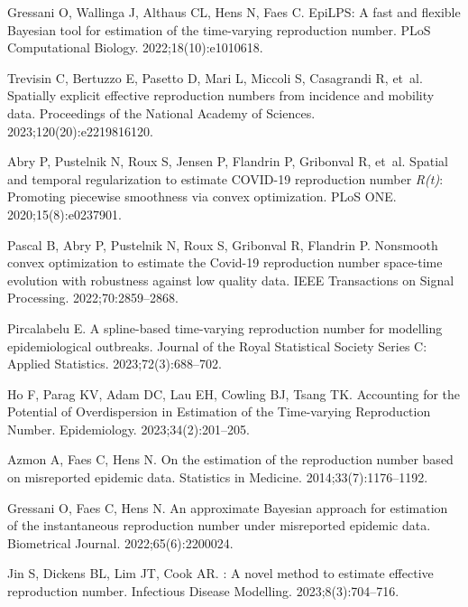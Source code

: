 \documentclass[10pt,letterpaper]{article}
\begin{document}
\begin{thebibliography}{10}
  Gressani O, Wallinga J, Althaus CL, Hens N, Faes C.
  \newblock EpiLPS: A fast and flexible {B}ayesian tool for estimation of the
    time-varying reproduction number.
  \newblock PLoS Computational Biology. 2022;18(10):e1010618.
  
  Trevisin C, Bertuzzo E, Pasetto D, Mari L, Miccoli S, Casagrandi R, et~al.
  \newblock Spatially explicit effective reproduction numbers from incidence and
    mobility data.
  \newblock Proceedings of the National Academy of Sciences.
    2023;120(20):e2219816120.
  
  Abry P, Pustelnik N, Roux S, Jensen P, Flandrin P, Gribonval R, et~al.
  \newblock Spatial and temporal regularization to estimate {COVID-19}
    reproduction number \emph{R(t)}: Promoting piecewise smoothness via convex
    optimization.
  \newblock PLoS ONE. 2020;15(8):e0237901.
  
  Pascal B, Abry P, Pustelnik N, Roux S, Gribonval R, Flandrin P.
  \newblock Nonsmooth convex optimization to estimate the {C}ovid-19 reproduction
    number space-time evolution with robustness against low quality data.
  \newblock IEEE Transactions on Signal Processing. 2022;70:2859--2868.
  
  Pircalabelu E.
  \newblock A spline-based time-varying reproduction number for modelling
    epidemiological outbreaks.
  \newblock Journal of the Royal Statistical Society Series C: Applied
    Statistics. 2023;72(3):688--702.
  
  Ho F, Parag KV, Adam DC, Lau EH, Cowling BJ, Tsang TK.
  \newblock Accounting for the Potential of Overdispersion in Estimation of the
    Time-varying Reproduction Number.
  \newblock Epidemiology. 2023;34(2):201--205.
  
  Azmon A, Faes C, Hens N.
  \newblock On the estimation of the reproduction number based on misreported
    epidemic data.
  \newblock Statistics in Medicine. 2014;33(7):1176--1192.
  
  Gressani O, Faes C, Hens N.
  \newblock An approximate {B}ayesian approach for estimation of the
    instantaneous reproduction number under misreported epidemic data.
  \newblock Biometrical Journal. 2022;65(6):2200024.
  
  Jin S, Dickens BL, Lim JT, Cook AR.
  : A novel method to estimate effective reproduction number.
  \newblock Infectious Disease Modelling. 2023;8(3):704--716.
  

\end{thebibliography}
\end{document}

